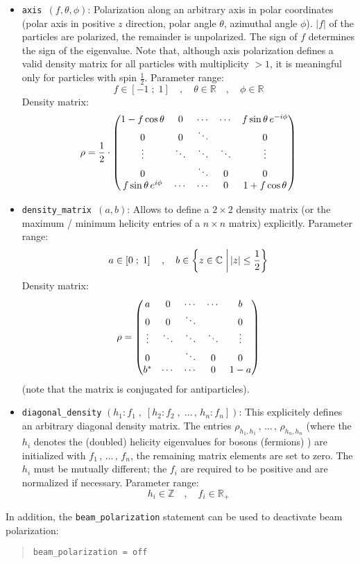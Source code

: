 \documentclass[12pt]{book}
\newcommand{\ttt}[1]{\texttt{#1}}
\begin{document}
{\begin{itemize}
lowest helicity states are populated), it is meaningful only for
spin $\frac{1}{2}$ particles and massless bosons of spin $>0$. Parameter
range:
\[ f \in \left[-1\;;\;1\right] \quad,\quad \phi \in \mathbb{R} \]
Density matrix:
\[ \rho =
\cssparse{1}{1}
   {\frac{f}{2}\,e^{-i\phi}} {\frac{f}{2}\,e^{i\phi}} \]
(for antiparticles, the matrix is conjugated).
%
\item\ttt{axis $\left(f, \theta, \phi\right)$}:
Polarization along an arbitrary axis in polar coordinates (polar axis in
positive $z$ direction, polar angle $\theta$, azimuthal angle $\phi$).
$\left|f\right|$ of the particles are polarized, the remainder is unpolarized.
The sign of $f$ determines the sign of the eigenvalue.
Note that, although axis polarization defines a valid density matrix for all
particles with multiplicity $>1$, it is meaningful only for particles
with spin $\frac{1}{2}$. Parameter range:
\[ f \in \left[-1\;;\;1\right] \quad,\quad \theta \in \mathbb{R} \quad,\quad
\phi \in \mathbb{R} \]
Density matrix:
\[ \rho = \frac{1}{2}\cdot
\cssparse{1 - f\cos\theta}{1 + f\cos\theta}
   {f\sin\theta\, e^{-i\phi}}{f\sin\theta\, e^{i\phi}}
\]
%
\item\ttt{density\_matrix $\left(a, b\right)$}:
Allows to define a $2\times2$ density matrix (or the maximum / minimum helicity
entries of a $n\times n$ matrix) explicitly. Parameter range:
\[ a \in \left[0\;;\;1\right] \quad,\quad
b \in\left\{z\in\mathbb{C}\left.\vphantom{\frac{1}{2}}
   \right|\left|z\right|\le \frac{1}{2}\right\} \]
Density matrix:
\[ \rho = \cssparse{a}{1-a}{b}{b^*} \]
(note that the matrix is conjugated for antiparticles).
%
\item\ttt{diagonal\_density} $\left(h_1:f_1\;,\; \left[h_2:f_2\;,\;
\dots\,,\,h_n:f_n\right]\right)$:
This explicitely defines an arbitrary diagonal density matrix. The entries
$\rho_{h_1,h_1}\,,\,\dots\,,\,\rho_{h_n,h_n}$
(where the $h_i$ denotes the (doubled) helicity
eigenvalues for bosons (fermions) ) are initialized
with $f_1\,,\,\dots\,,\,f_n$, the
remaining matrix elements are set to zero. The $h_i$ must be mutually different;
the $f_i$ are required to be positive and are normalized if necessary.
Parameter range:
\[ h_i\in \mathbb{Z} \quad,\quad f_i \in \mathbb{R}_+ \]
\end{itemize}
}
%
In addition, the \ttt{beam\_polarization} statement can be used to deactivate
beam polarization:
%
\begin{quote}
\begin{footnotesize}
\begin{verbatim}
beam_polarization = off
\end{verbatim}
\end{footnotesize}
\end{quote}
%
\end{document}
